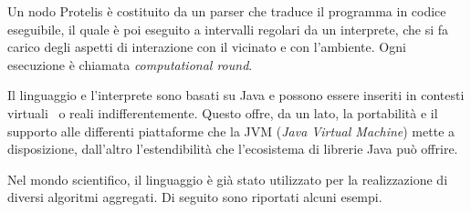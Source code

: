 Un nodo Protelis è costituito da un parser che traduce il programma in codice eseguibile, il quale è poi eseguito a intervalli regolari da un interprete, che si fa carico degli aspetti di interazione con il vicinato e con l'ambiente.
Ogni esecuzione è chiamata \emph{computational round}.

Il linguaggio e l'interprete sono basati su Java e possono essere inseriti in contesti virtuali~\cite{ProtelisSAC14} o reali indifferentemente.
Questo offre, da un lato, la portabilità e il supporto alle differenti piattaforme che la JVM (\emph{Java Virtual Machine}) mette a disposizione, dall'altro l'estendibilità che l'ecosistema di librerie Java può offrire.

Nel mondo scientifico, il linguaggio è già stato utilizzato per la realizzazione di diversi algoritmi aggregati.
Di seguito sono riportati alcuni esempi.


